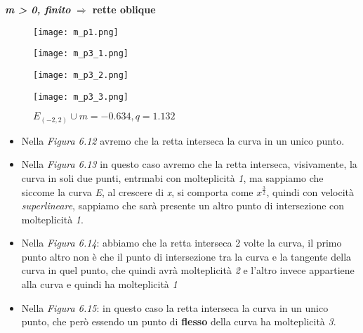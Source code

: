 \newpage
\begin{center}
    \textbf{\textit{m > 0, finito}} $\Rightarrow$ \textbf{rette oblique}
    \begin{figure}[h]
        \centering
        \begin{minipage}[t]{0.45\textwidth}
            \centering
            \texttt{[image: m\_p1.png]}
            \caption{$E_{(-2, 2)} \cup m = 4$}
        \end{minipage}
        \hfill
        \begin{minipage}[t]{0.45\textwidth}
            \centering
            \texttt{[image: m\_p3\_1.png]}
            \caption{$E_{(-2, 2)} \cup m = 0.5$}
        \end{minipage}
        \begin{minipage}[t]{0.45\textwidth}
            \centering
            \texttt{[image: m\_p3\_2.png]}
            \caption{$E_{(-2, 2)} \cup m = -0.741, q = 1.416$}
        \end{minipage}
        \hfill
        \begin{minipage}[t]{0.45\textwidth}
            \centering
            \texttt{[image: m\_p3\_3.png]}
            \caption{$E_{(-2, 2)} \cup m = -0.634, q = 1.132$}
        \end{minipage}
    \end{figure}
\end{center}
\begin{itemize}
    \item Nella \textit{Figura 6.12} avremo che la retta interseca la curva in un unico punto.
    \item Nella \textit{Figura 6.13} in questo caso avremo che la retta interseca, visivamente, la curva in soli due punti, entrmabi con molteplicità \textit{1}, ma sappiamo che siccome la curva \textit{E}, al crescere di \textit{x}, si comporta come $x^{\frac{3}{2}}$, quindi con velocità \textit{superlineare}, sappiamo che sarà presente un altro punto di intersezione con molteplicità \textit{1}.
    \item Nella \textit{Figura 6.14}: abbiamo che la retta interseca 2 volte la curva, il primo punto altro non è che il punto di intersezione tra la curva e la tangente della curva in quel punto, che quindi avrà molteplicità \textit{2} e l'altro invece appartiene alla curva e quindi ha molteplicità \textit{1}
    \item Nella \textit{Figura 6.15}: in questo caso la retta interseca la curva in un unico punto, che però essendo un punto di \textbf{flesso} della curva ha molteplicità \textit{3}.
\end{itemize}
